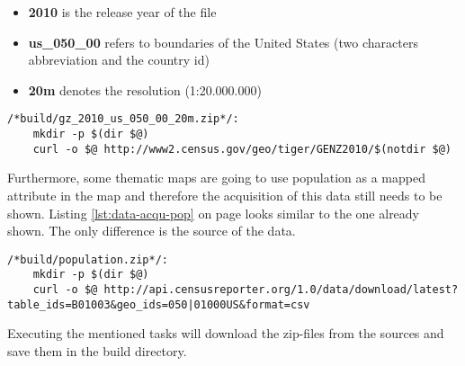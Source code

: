 \begin{itemize}
\item \textbf{2010} is the release year of the file
\item \textbf{us\_050\_00} refers to boundaries of the United States (two characters abbreviation and the country id)
\item \textbf{20m} denotes the resolution (1:20.000.000)
\end{itemize}

\begin{lstlisting}[style={makefile}, caption={Make task for downloading cartographic boundaries}, label={lst:data-acqu-zip}]
/*build/gz_2010_us_050_00_20m.zip*/:
    mkdir -p $(dir $@)
    curl -o $@ http://www2.census.gov/geo/tiger/GENZ2010/$(notdir $@)
\end{lstlisting}

Furthermore, some thematic maps are going to use population as a mapped attribute in the map and therefore the acquisition of this data still needs to be shown. Listing \ref{lst:data-acqu-pop} on page \pageref{lst:data-acqu-pop} looks similar to the one already shown. The only difference is the source of the data.

\begin{lstlisting}[style={makefile}, caption={Make task for downloading population of counties}, label={lst:data-acqu-pop}]
/*build/population.zip*/:
    mkdir -p $(dir $@)
    curl -o $@ http://api.censusreporter.org/1.0/data/download/latest?table_ids=B01003&geo_ids=050|01000US&format=csv

\end{lstlisting}

Executing the mentioned tasks will download the zip-files from the sources and save them in the build directory.
